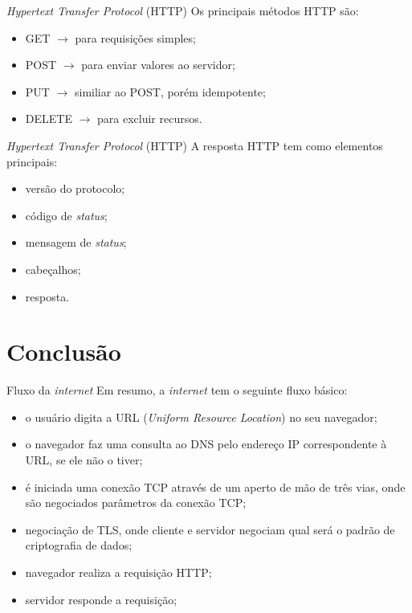 \documentclass[11pt]{beamer}
\begin{document}
    \begin{frame}{\textit{Hypertext Transfer Protocol} (HTTP)}
      Os principais métodos HTTP são:
      \begin{itemize}
        \item GET $\rightarrow$ para requisições simples;
        \item POST $\rightarrow$ para enviar valores ao servidor;
        \item PUT $\rightarrow$ similiar ao POST, porém idempotente;
        \item DELETE $\rightarrow$ para excluir recursos.
      \end{itemize}
    \end{frame}

    \begin{frame}{\textit{Hypertext Transfer Protocol} (HTTP)}
      A resposta HTTP tem como elementos principais:
      \begin{itemize}
        \item versão do protocolo;
        \item código de \textit{status};
        \item mensagem de \textit{status};
        \item cabeçalhos;
        \item resposta.
      \end{itemize}
    \end{frame}

    \section{Conclusão}

    \begin{frame}{Fluxo da \textit{internet}}
      Em resumo, a \textit{internet} tem o seguinte fluxo básico:
      \begin{itemize}
        \item o usuário digita a URL (\textit{Uniform Resource Location}) no seu navegador;
        \item o navegador faz uma consulta ao DNS pelo endereço IP correspondente à URL, se ele não o tiver;
        \item é iniciada uma conexão TCP através de um aperto de mão de três vias, onde são negociados parâmetros da conexão TCP;
        \item negociação de TLS, onde cliente e servidor negociam qual será o padrão de criptografia de dados;
        \item navegador realiza a requisição HTTP;
        \item servidor responde a requisição;
      \end{itemize}
    \end{frame}
\end{document}
